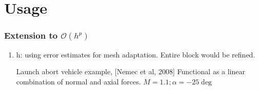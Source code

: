 \documentclass{beamer}
\begin{document}



\section[Usage]{Usage}

\begin{frame}%
\frametitle{\LARGE Extension to {$\mathcal{O}(h^p)$}}
\begin{minipage}[t][1\textheight]{1\textwidth}
\scriptsize
\begin{enumerate}[1.]
\vspace{-10pt}
\item h: using error estimates for mesh adaptation. Entire block would be refined.
\vspace{-10pt}
\hspace{10em}
\begin{exampleblock}{Launch abort vehicle example, [Nemec et al, 2008]}
\tiny
Functional as a linear combination of normal and axial forces. $M = 1.1; \alpha=-25\deg$
\vspace{-10pt}

\begin{figure}
\label{fig:LAVone}
\centering
{}
\end{figure}
\end{exampleblock}


\end{enumerate}
\end{minipage}
\end{frame}
\end{document}
